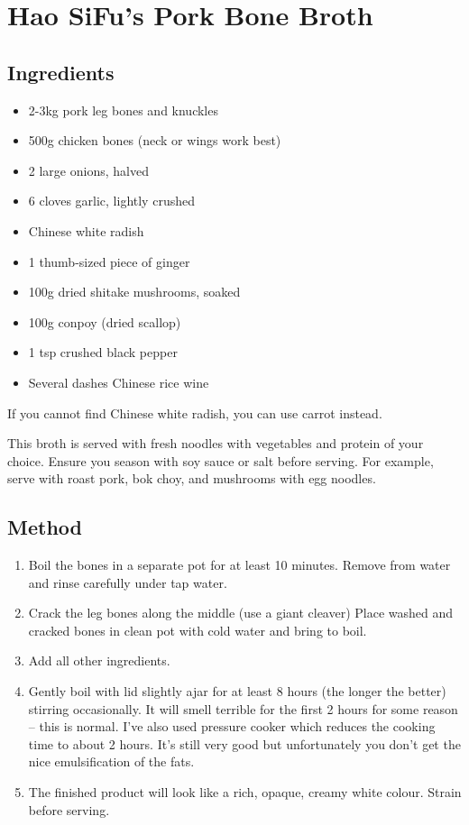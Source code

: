 \clearpage
\section{Hao SiFu's Pork Bone Broth}
  \begin{multicols}{2}
    \subsection{Ingredients}
      \begin{itemize}
        \item 2-3kg pork leg bones and knuckles
        \item 500g chicken bones (neck or wings work best)
        \item 2 large onions, halved
        \item 6 cloves garlic, lightly crushed
        \item {} Chinese white radish
        \item 1 thumb-sized piece of ginger
        \item 100g dried shitake mushrooms, soaked
        \item 100g conpoy (dried scallop)
        \item 1 tsp crushed black pepper
        \item Several dashes Chinese rice wine
      \end{itemize}
      If you cannot find Chinese white radish, you can use carrot instead.

      This broth is served with fresh noodles with vegetables and protein of your choice. Ensure you season with soy sauce or salt before serving. For example, serve with roast pork, bok choy, and mushrooms with egg noodles.
  \vfill\null
  \columnbreak
  \subsection{Method}
    \begin{enumerate}
      \item Boil the bones in a separate pot for at least 10 minutes. Remove from water and rinse carefully under tap water.
      \item Crack the leg bones along the middle (use a giant cleaver) Place washed and cracked bones in clean pot with cold water and bring to boil.
      \item Add all other ingredients.
      \item Gently boil with lid slightly ajar for at least 8 hours (the longer the better) stirring occasionally. It will smell terrible for the first 2 hours for some reason – this is normal. I've also used pressure cooker which reduces the cooking time to about 2 hours. It's still very good but unfortunately you don't get the nice emulsification of the fats.
      \item The finished product will look like a rich, opaque, creamy white colour. Strain before serving.
    \end{enumerate}
  \end{multicols}
